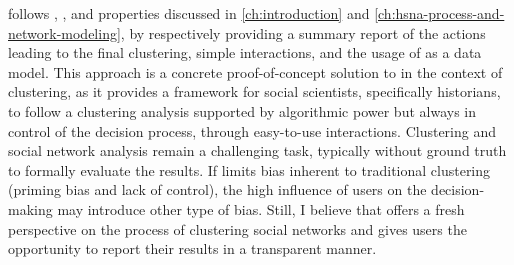 \pkclustering follows \traceability, \simplicity, and \reality properties discussed in \autoref{ch:introduction} and \autoref{ch:hsna-process-and-network-modeling}, by respectively providing a summary report of the actions leading to the final clustering, simple interactions, and the usage of \modelplural as a data model.
This approach is a concrete proof-of-concept solution to \qthree in the context of clustering, as it provides a framework for social scientists, specifically historians, to follow a clustering analysis supported by algorithmic power but always in control of the decision process, through easy-to-use interactions.
Clustering and social network analysis remain a challenging task, typically without ground truth to formally evaluate the results.
If \pkclustering limits bias inherent to traditional clustering (priming bias and lack of control), the high influence of users on the decision-making may introduce other type of bias.
Still, I believe that \pkclustering offers a fresh perspective on the process of clustering social networks and gives users the opportunity to report their results in a transparent manner.

